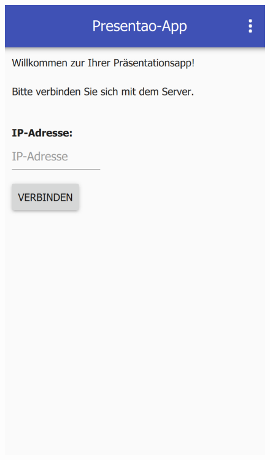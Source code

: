 \begin{figure}[ht!]
	\centering
	\begin{minipage}{0.31\linewidth}
		\centering
		\includegraphics[scale=0.5]{GUI/Bilder/1-Startbildschirm.PNG}
	\end{minipage}
	\begin{minipage}{0.31\linewidth}
		\centering

\end{minipage}
\end{figure}

